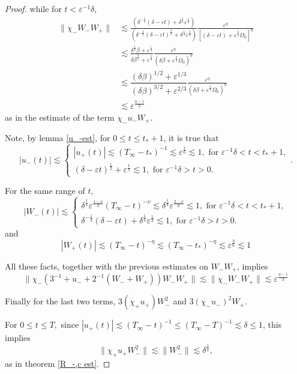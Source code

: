 \documentclass[letterpaper,11pt]{article}
\newcommand{\eps}{\varepsilon}
\newcommand{\lar}{ \lesssim }
\numberwithin{equation}{section}
\theoremstyle{plain}
\begin{document}
\begin{enumerate}
\begin{itemize}
\begin{enumerate}
\begin{proof}
while for $t < \eps^{-1}\delta$, 
\begin{align*}
\|\chi_-W_- W_+ \| & \lar \frac{\left( \delta^{-\frac{1}{4}}(\delta-\eps t)+\delta^{\frac{1}{4}}\eps^{\frac{1}{3}} \right) }{\left(\delta^{-\frac{1}{4}}(\delta-\eps t)^{\frac{3}{2}} +\delta^{\frac{1}{4}} \eps^{\frac{2}{3}} \right)} \frac{\eps^{\eta}}{[(\delta-\eps t)+\eps^{\frac{2}{3}}\Omega_0]^{\eta}} \\
& \lar \frac{\delta^{\frac{1}{2}}\beta+\eps^{\frac{1}{3}}}{\delta\beta^{\frac{3}{2}}+\eps^{\frac{2}{3}}}\frac{\eps^\eta}{(\delta \beta + \eps^{\frac{2}{3}}\Omega_0)^\eta}   \\
& \lar \dfrac{(\delta \beta)^{1/2} + \eps^{1/3}} {(\delta \beta)^{3/2} + \eps^{2/3}}\frac{\eps^\eta}{(\delta \beta + \eps^{\frac{2}{3}}\Omega_0)^\eta}\\
&\lar \eps^{\frac{\eta-1}{3}} 
\end{align*}
as in the estimate of the term $\chi_-u_-W_+$.

Note, by lemma \ref{u_-est}, for $0\le t \le t_*+1$, it is true that 
\[
|u_-(t)| \lar \begin{cases}
 |u_+(t)| \lar (T_\infty-t_*)^{-1}\lar \eps^{\frac{1}{6}}\lar 1, \text{ for }\eps^{-1}\delta < t < t_*+1,\\
 (\delta-\eps t)^{\frac{1}{2}}+\eps^{\frac{1}{3}}\lar 1, \text{ for }\eps^{-1}\delta > t > 0.
\end{cases}.
\]

For the same range of $t$,
\[
|W_-(t)| \lar\begin{cases}
 \delta^{\frac{1}{4}}\eps^{\frac{1-\nu}{3}}(T_\infty-t)^{-\nu} \lar \delta^{\frac{1}{4}}\eps^{\frac{2-\nu}{6}} \lar 1, \text{ for }\eps^{-1}\delta < t < t_*+1,\\
 \delta^{-\frac{1}{4}}(\delta-\eps t)+\delta^{\frac{1}{4}}\eps^{\frac{1}{3}} \lar 1, \text{ for }\eps^{-1}\delta > t > 0.
\end{cases}
\]
and 
\[
|W_+(t)| \lar (T_\infty-t)^{-\eta} \lar (T_\infty-t_*)^{-\eta} \lar \eps^{\frac{\eta}{6}} \lar 1
\]

All these facts, together with the previous estimates on $W_-W_+$, implies  
\[
\|\chi_-(3^{-1}+u_- +2^{-1}(W_-+W_+))W_-W_+\| \lar \|\chi_-W_-W_+\| \lar \eps^{\frac{\eta-1}{3}}
\]

Finally for the last two terms, $3(\chi_+u_+)W_-^2$ and $ 3(\chi_-u_-)^2W_+$.

For $0\le t \le T,$ since $|u_+(t)| \lar (T_\infty-t)^{-1} \le (T_\infty-T)^{-1} \lar \delta \le 1$, this implies
\[
\|\chi_+u_+W_-^2\| \lar \|W_-^2\| \lar \delta^{\frac{1}{4}},
\]
as in theorem \ref{R_-,c est}.



\end{proof}
\end{enumerate}
\end{itemize}
\end{enumerate}
\end{document}

